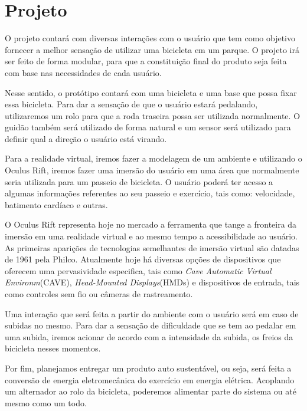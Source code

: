 \chapter[Projeto]{Projeto}
O projeto contará com diversas interações com o usuário que tem como objetivo fornecer a melhor sensação de utilizar uma bicicleta em um parque. O projeto irá ser feito de forma modular, para que a constituição final do produto seja feita com base nas necessidades de cada usuário. 

Nesse sentido, o protótipo contará com uma bicicleta e uma base que possa fixar essa bicicleta. Para dar a sensação de que o usuário estará pedalando, utilizaremos um rolo para que a roda traseira possa ser utilizada normalmente. O guidão também será utilizado de forma natural e um sensor será utilizado para definir qual a direção o usuário está virando. 

Para a realidade virtual, iremos fazer a modelagem de um ambiente e utilizando o Oculus Rift, iremos fazer uma imersão do usuário em uma área que normalmente seria utilizada para um passeio de bicicleta. O usuário poderá ter acesso a algumas informações referentes ao seu passeio e exercício, tais como: velocidade, batimento cardíaco e outras. 

O Oculus Rift representa hoje no mercado a ferramenta que tange a fronteira da imersão em uma realidade virtual e ao mesmo tempo a acessibilidade ao usuário. As primeiras aparições de tecnologias semelhantes de imersão virtual são datadas de 1961 pela Philco\cite{boasoverview}. Atualmente hoje há diversas opções de dispositivos que oferecem uma pervasividade especifica, tais como \textit{Cave Automatic Virtual Environm}(CAVE), \textit{Head-Mounted Displays}(HMDs) e dispositivos de entrada, tais como controles sem fio ou câmeras de rastreamento.

Uma interação que será feita a partir do ambiente com o usuário será em caso de subidas no mesmo. Para dar a sensação de dificuldade que se tem ao pedalar em uma subida, iremos acionar de acordo com a intensidade da subida, os freios da bicicleta nesses momentos. 

Por fim, planejamos entregar um produto auto sustentável, ou seja, será feita a conversão de energia eletromecânica do exercício em energia elétrica. Acoplando um alternador ao rolo da bicicleta, poderemos alimentar parte do sistema ou até mesmo como um todo.

